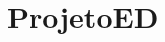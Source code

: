 \chapter{Projeto\+ED}
\hypertarget{md__r_e_a_d_m_e}{}\label{md__r_e_a_d_m_e}
\label{md__r_e_a_d_m_e_autotoc_md0}%
%

